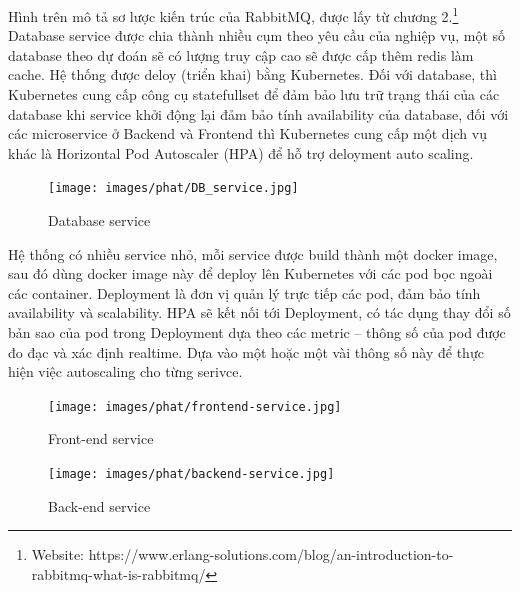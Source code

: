 \noindent Hình trên mô tả sơ lược kiến trúc của RabbitMQ, được lấy từ chương 2.\footnote{Website: https://www.erlang-solutions.com/blog/an-introduction-to-rabbitmq-what-is-rabbitmq/}\\[0.5cm]
\noindent Database service được chia thành nhiều cụm theo yêu cầu của nghiệp vụ, một số database theo dự đoán sẽ có lượng truy cập cao sẽ được cấp thêm redis làm cache. Hệ thống được deloy (triển khai) bằng Kubernetes. Đối với database, thì Kubernetes cung cấp công cụ statefullset để đảm bảo lưu trữ trạng thái của các database khi service khởi động lại đảm bảo tính availability của database, đối với các microservice ở Backend và Frontend thì Kubernetes cung cấp một dịch vụ khác là Horizontal Pod Autoscaler (HPA) để hỗ trợ deloyment auto scaling.
 \begin{figure}[H]
    \begin{center}
    \texttt{[image: images/phat/DB\_service.jpg]}
    \vspace*{7mm}
    \caption{Database service}
    \end{center}
    \label{}
\end{figure}
\noindent Hệ thống có nhiều service nhỏ, mỗi service được build thành một docker image, sau đó dùng docker image này để deploy lên Kubernetes với các pod bọc ngoài các container. Deployment là đơn vị quản lý trực tiếp các pod, đảm bảo tính availability và scalability. HPA sẽ kết nối tới Deployment, có tác dụng thay đổi số bản sao của pod trong Deployment dựa theo các metric – thông số của pod được đo đạc và xác định realtime. Dựa vào một hoặc một vài thông số này để thực hiện việc autoscaling cho từng serivce.
 \begin{figure}[H]
    \begin{center}
    \texttt{[image: images/phat/frontend-service.jpg]}
    \vspace*{7mm}
    \caption{Front-end service}
    \end{center}
    \label{}
\end{figure}
 \begin{figure}[H]
    \begin{center}
    \texttt{[image: images/phat/backend-service.jpg]}
    \vspace*{7mm}
    \caption{Back-end service}
    \end{center}
    \label{}
\end{figure}

